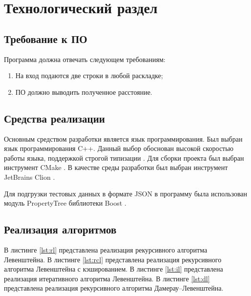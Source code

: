 \chapter{Технологический раздел}
\label{cha:impl}


\section{Требование к ПО}

Программа должна отвечать следующем требованиям:
\begin{enumerate}
	\item На вход подаются две строки в любой раскладке;
	\item ПО должно выводить полученное расстояние.
\end{enumerate}

\section{Средства реализации}


Основным средством разработки является язык программирования. Был выбран язык программирования C++. Данный выбор обоснован высокой скоростью работы языка, поддержкой строгой типизации \cite{cpplang}. Для сборки проекта был выбран инструмент CMake \cite{cmake}.  В качестве среды разработки был выбран инструмент JetBrains Clion \cite{clion}.

Для подгрузки тестовых данных в формате JSON \cite{json} в программу была использован модуль PropertyTree библиотеки Boost \cite{boost}.  

\section{Реализация алгоритмов}

В листинге \ref{lst:rl} представлена реализация рекурсивного алгоритма Левенштейна.
В листинге \ref{lst:rcl} представлена реализация рекурсивного алгоритма Левенштейна с кэшированием.
В листинге \ref{lst:il} представлена реализация итеративного алгоритма Левенштейна.
В листинге \ref{lst:dl} представлена реализация рекурсивного алгоритма Дамерау--Левенштейна.






